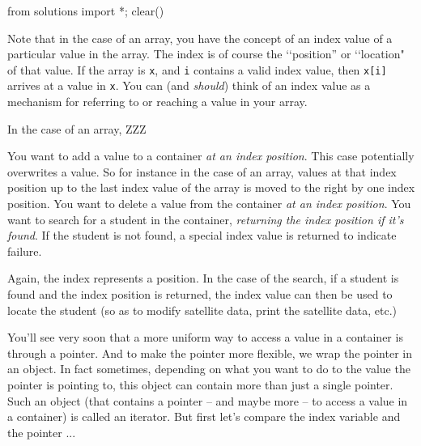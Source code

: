 \begin{python0}
from solutions import *; clear()
\end{python0}

Note that in the case of an array, you have the concept of
an index value of a particular value in the array.
The index is of course the \lq\lq position'' or
\lq\lq location"
of that value.
If the array is \texttt{x}, and \verb!i! contains a valid index value,
then \texttt{x[i]} arrives at a value in \verb!x!.
You can (and \textit{should}) think of an index value as
a mechanism for referring to or reaching a value in your array.

In the case of an array, ZZZ
\begin{myenum}
  \li You want to add a value to a container \textit{at an index position}.
  This case potentially overwrites a value.
  So for instance in the case of an array, values at that
  index position up to the last index value of the array is moved to the
  right by one index position.
  \li You want to delete a value from the container
  \textit{at an index position}.
  \li You want to search for a student in the container,
  \textit{returning the index position if it's found}.
  If the student is not found, a special index value is returned to
  indicate failure.
\end{myenum}

Again, the index represents a position.
In the case of the search, if a student is found and the index position
is returned, the index value can then be used to
locate the student (so as to modify satellite data, print
the satellite data, etc.)

You'll see very soon that a more uniform way to
access a value in a container is through
a pointer.
And to make the pointer more flexible,
we wrap the pointer in an object.
In fact sometimes, depending on what you want to do to the value
the pointer is pointing to, this object can contain more than just
a single pointer.
Such an object (that contains a pointer -- and maybe more -- to access a value
in a container) is called an iterator.
But first let's compare the index variable and the pointer ...
